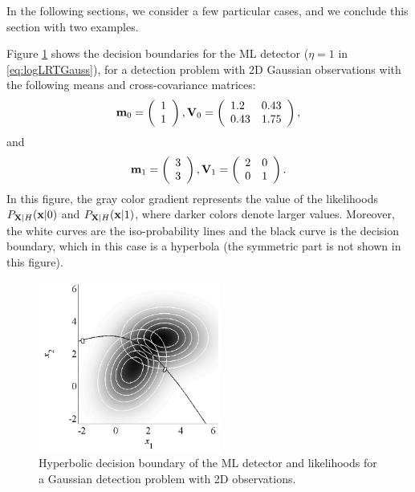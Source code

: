 In the following sections, we consider a few particular cases, and we conclude this section with two examples.

\begin{example}
	Figure \ref{fig:DecGauss2Dhip} shows the decision boundaries for the ML detector ($\eta = 1$ in \eqref{eq:logLRTGauss}), for a detection problem with 2D Gaussian observations with the following means and cross-covariance matrices:
	\begin{equation*}
	{\bf m}_0 =  \left(\begin{array}{l}  1 \\ 1 \end{array}\right), {\bf V}_0 = 
	\left(\begin{array}{ll} 1.2 & 0.43 \\ 0.43 & 1.75 \end{array} \right),
	\end{equation*}
	and
	\begin{equation*}
	{\bf m}_1 = \left(\begin{array}{l}  3 \\ 3 \end{array}\right), {\bf V}_1 = 
	\left(\begin{array}{ll} 2 & 0 \\ 0 & 1 \end{array} \right).
	\end{equation*}
	In this figure, the gray color gradient  represents the value of the likelihoods $P_{{\bf X}|H}({\bf x}|0)$ and $P_{{\bf X}|H}({\bf x}|1)$, where darker colors denote larger values. Moreover, the white curves are the iso-probability lines and the black curve is the decision boundary, which in this case is a hyperbola (the symmetric part is not shown in this figure).
	
	\begin{figure}[htb]
		\begin{center}
			\includegraphics[width=6cm]{Figures/DecGauss2Dhip}
			\caption{Hyperbolic decision boundary of the ML detector and likelihoods for a Gaussian detection problem with 2D observations.}
			\label{fig:DecGauss2Dhip}
		\end{center}
	\end{figure}
\end{example}

